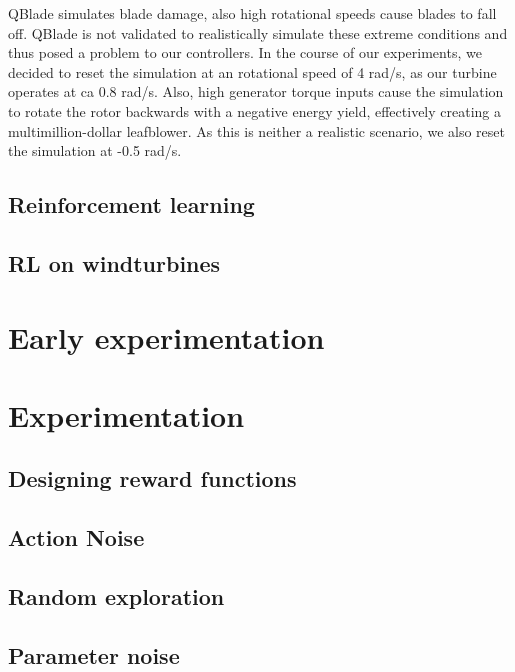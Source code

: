 \documentclass[hyperref,german,beleg]{cgvpub}
\begin{document}
QBlade simulates blade damage, also high rotational speeds cause blades to fall off. QBlade is not validated to realistically simulate these extreme conditions and thus posed a problem to our controllers. In the course of our experiments, we decided to reset the simulation at an rotational speed of 4 rad/s, as our turbine operates at ca 0.8 rad/s. Also, high generator torque inputs cause the simulation to rotate the rotor backwards with a negative energy yield, effectively creating a multimillion-dollar leafblower. As this is neither a realistic scenario, we also reset the simulation at -0.5 rad/s. 

\section{Reinforcement learning}


\section{RL on windturbines}


\chapter{Early experimentation}

\chapter{Experimentation}

\section{Designing reward functions}

\section{Action Noise}

\section{Random exploration}

\section{Parameter noise}
\end{document}

